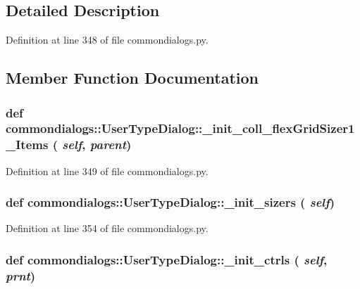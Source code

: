 \subsection{Detailed Description}




Definition at line 348 of file commondialogs.py.

\subsection{Member Function Documentation}
\hypertarget{classcommondialogs_1_1UserTypeDialog_8ac2aa09f370cda00dcc3a5535230a65}{
\subsubsection[\_\-init\_\-coll\_\-flexGridSizer1\_\-Items]{\setlength{\rightskip}{0pt plus 5cm}def commondialogs::User\-Type\-Dialog::\_\-init\_\-coll\_\-flex\-Grid\-Sizer1\_\-Items ( {\em self},  {\em parent})}}
\label{classcommondialogs_1_1UserTypeDialog_8ac2aa09f370cda00dcc3a5535230a65}




Definition at line 349 of file commondialogs.py.\hypertarget{classcommondialogs_1_1UserTypeDialog_030a0508da4e397f69bfd5824987df70}{
\subsubsection[\_\-init\_\-sizers]{\setlength{\rightskip}{0pt plus 5cm}def commondialogs::User\-Type\-Dialog::\_\-init\_\-sizers ( {\em self})}}
\label{classcommondialogs_1_1UserTypeDialog_030a0508da4e397f69bfd5824987df70}




Definition at line 354 of file commondialogs.py.\hypertarget{classcommondialogs_1_1UserTypeDialog_6a633899d2349b962f87b05b542a74d1}{
\subsubsection[\_\-init\_\-ctrls]{\setlength{\rightskip}{0pt plus 5cm}def commondialogs::User\-Type\-Dialog::\_\-init\_\-ctrls ( {\em self},  {\em prnt})}}
\label{classcommondialogs_1_1UserTypeDialog_6a633899d2349b962f87b05b542a74d1}





